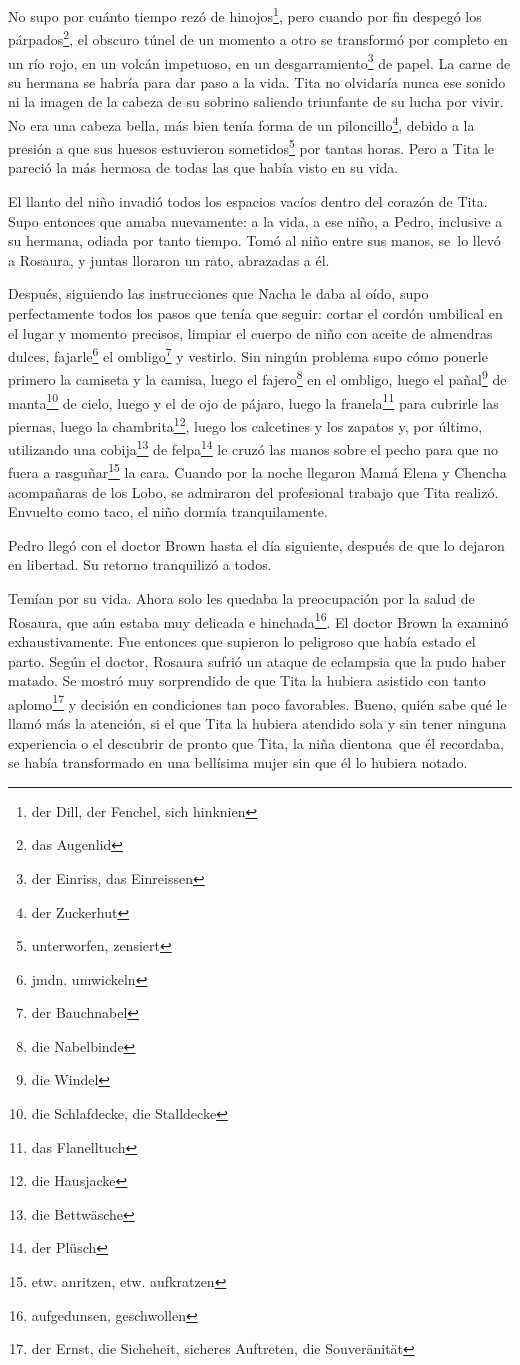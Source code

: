 No supo por cuánto tiempo rezó de hinojos\footnote{der Dill, der Fenchel, sich hinknien}, pero cuando por fin despegó los párpados\footnote{das Augenlid},
el obscuro túnel de un momento a otro se transformó por completo en un río
rojo, en un volcán impetuoso, en un desgarramiento\footnote{der Einriss, das Einreissen} de
papel. La carne de su hermana se habría para dar paso a la vida. Tita no
olvidaría nunca ese sonido ni la imagen de la cabeza de su sobrino
saliendo triunfante de su lucha por vivir. No era una cabeza bella, más
bien tenía forma de un piloncillo\footnote{der Zuckerhut},
debido a la presión a que sus huesos estuvieron sometidos\footnote{unterworfen, zensiert}
por tantas horas. Pero a Tita le pareció la más hermosa de todas las que
había visto en su vida.

El llanto del niño invadió todos los espacios vacíos dentro del corazón
de Tita. Supo entonces que amaba nuevamente: a la vida, a ese niño, a
Pedro, inclusive a su hermana, odiada por tanto tiempo. Tomó al niño
entre sus manos, se~lo llevó a Rosaura, y juntas lloraron un rato,
abrazadas a él.

Después, siguiendo las instrucciones que Nacha le daba al oído, supo
perfectamente todos los pasos que tenía que seguir: cortar el cordón
umbilical en el lugar y momento precisos, limpiar el cuerpo de niño con
aceite de almendras dulces, fajarle\footnote{jmdn. umwickeln}
el ombligo\footnote{der Bauchnabel} y vestirlo. Sin ningún
problema supo cómo ponerle primero la camiseta y la camisa, luego el fajero\footnote{die Nabelbinde} en el ombligo, luego el pañal\footnote{die Windel}
de manta\footnote{die Schlafdecke, die Stalldecke} de cielo, luego
y el de ojo de pájaro, luego la franela\footnote{das Flanelltuch}
para cubrirle las piernas, luego la chambrita\footnote{die Hausjacke},
luego los calcetines y los zapatos y, por último, utilizando
una cobija\footnote{die Bettwäsche} de felpa\footnote{der Plüsch} le cruzó las manos sobre el
pecho para que no fuera a rasguñar\footnote{etw. anritzen, etw. aufkratzen}
la cara. Cuando por la noche llegaron Mamá Elena y Chencha
acompañaras de los Lobo, se admiraron del profesional trabajo que Tita
realizó. Envuelto como taco, el niño dormía tranquilamente.

Pedro llegó con el doctor Brown hasta el día siguiente, después de que lo
dejaron en libertad. Su retorno tranquilizó a todos.

Temían por su vida. Ahora solo les quedaba la preocupación por la salud
de Rosaura, que aún estaba muy delicada e hinchada\footnote{aufgedunsen, geschwollen}.
El doctor Brown la examinó exhaustivamente. Fue entonces que supieron
lo peligroso que había estado el parto. Según el doctor, Rosaura sufrió
un ataque de eclampsia que la pudo haber matado. Se mostró muy sorprendido
de que Tita la hubiera asistido con tanto aplomo\footnote{der Ernst, die Sicheheit, sicheres Auftreten, die Souveränität}
y decisión en condiciones tan poco favorables. Bueno, quién sabe qué le
llamó más la atención, si el que Tita la hubiera atendido sola y sin
tener ninguna experiencia o el descubrir de pronto que Tita, la niña
dientona~que él recordaba, se había transformado en una bellísima
mujer sin que él lo hubiera notado.

